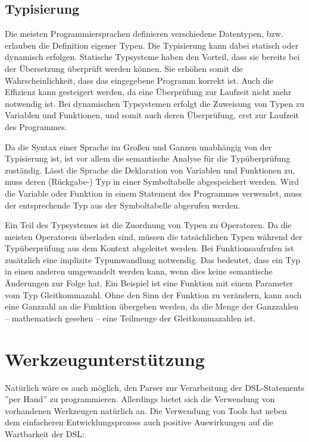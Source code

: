 \section{Typisierung}

Die meisten Programmiersprachen definieren verschiedene Datentypen, bzw. erlauben die Definition eigener Typen. Die Typisierung kann dabei statisch oder dynamisch erfolgen. Statische Typsysteme haben den Vorteil, dass sie bereits bei der Übersetzung überprüft werden können. Sie erhöhen somit die Wahrscheinlichkeit, dass das eingegebene Programm korrekt ist. Auch die Effizienz kann gesteigert werden, da eine Überprüfung zur Laufzeit nicht mehr not\-wen\-dig ist. Bei dynamischen Typsystemen erfolgt die Zuweisung von Typen zu Variablen und Funktionen, und somit auch deren Überprüfung, erst zur Laufzeit des Programmes.

Da die Syntax einer Sprache im Großen und Ganzen unabhängig von der Typisierung ist, ist vor allem die semantische Analyse für die Typ\-über\-prü\-fung zuständig. Lässt die Sprache die Deklaration von Variablen und Funktionen zu, muss deren (Rückgabe-) Typ in einer Symboltabelle abgespeichert werden. Wird die Variable oder Funktion in einem Statement des Programmes verwendet, muss der ent\-sprech\-ende Typ aus der Symboltabelle abgerufen werden.

Ein Teil des Typsystemes ist die Zuordnung von Typen zu Operatoren. Da die meisten Operatoren überladen sind, müssen die tatsächlichen Typen während der Typ\-über\-prü\-fung aus dem Kontext abgeleitet werden. Bei Funktionsaufrufen ist zusätzlich eine implizite Typumwandlung not\-wen\-dig. Das bedeutet, dass ein Typ in einen anderen umgewandelt werden kann, wenn dies keine semantische Än\-der\-ung\-en zur Folge hat. Ein Beispiel ist eine Funktion mit einem Parameter vom Typ Gleitkommazahl. Ohne den Sinn der Funktion zu verändern, kann auch eine Ganzzahl an die Funktion übergeben werden, da die Menge der Ganzzahlen -- mathematisch gesehen -- eine Teilmenge der Gleitkommazahlen ist.


\chapter{Werkzeugunterstützung}
\label{chapter_tools}

Natürlich wäre es auch möglich, den Parser zur Verarbeitung der DSL-Statements ''per Hand'' zu programmieren. Allerdings bietet sich die Verwendung von vorhandenen Werkzeugen natürlich an. Die Verwendung von Tools hat neben dem einfacheren Entwicklungsprozess auch positive Aus\-wir\-kun\-gen auf die Wartbarkeit der DSL:

